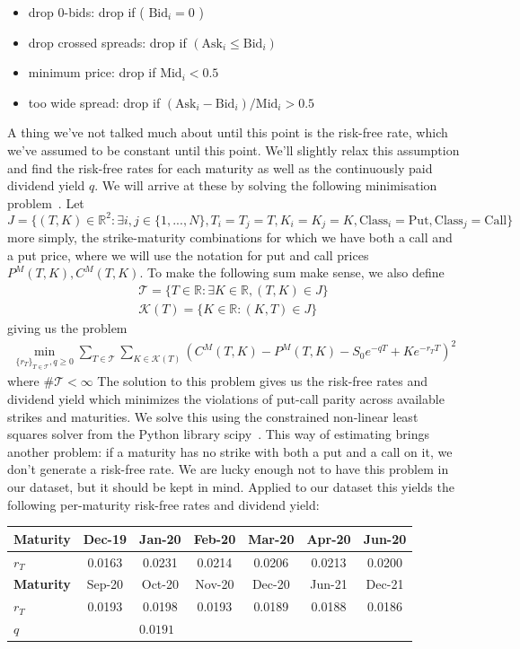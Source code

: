 \begin{itemize}
  \item drop 0-bids: drop if ( $\text{Bid}_i = 0$ )
  \item drop crossed spreads: drop if $( \text{Ask}_i \leq \text{Bid}_i )$
  \item minimum price: drop if  $\text{Mid}_i<0.5$
  \item too wide spread: drop if $(\text{Ask}_i-\text{Bid}_i)/\text{Mid}_i>0.5$
\end{itemize}
A thing we've not talked much about until this point is the risk-free rate, which we've assumed to be constant until this point. We'll
slightly relax this assumption and find the risk-free rates for each maturity as well as the continuously paid dividend yield $q$. We will
arrive at these by solving the following minimisation problem~\cite{DataHandeling}. Let 
$$J=\{(T,K)\in\mathbb{R}^2:\exists i,j\in\{1,...,N\} ,T_i=T_j=T,K_i=K_j=K,\text{Class}_i=\text{Put},\text{Class}_j=\text{Call}\}$$
more simply, the strike-maturity combinations for which we have both a call and a put price, where we will use the notation for put and call prices $P^M(T,K),C^M(T,K)$.
To make the following sum make sense, we also define 
\begin{align}
\mathcal{T}=\{T\in\mathbb{R}:\exists K\in\mathbb{R}, (T,K)\in J\}\\
\mathcal{K}(T)=\{K\in\mathbb{R}:(K,T)\in J\}
\end{align}
giving us the problem
\begin{align}
\min_{\{r_T\}_{T\in\mathcal{T}},q\geq0}\sum_{T\in\mathcal{T}}\sum_{K\in\mathcal{K}(T)}(C^M(T,K)-P^M(T,K)-S_0e^{-qT}+Ke^{-r_T T})^2
\end{align}
where $\#\mathcal{T}<\infty$
The solution to this problem gives us the risk-free rates and dividend yield which minimizes the violations of put-call
parity across available strikes and maturities. We solve this using the constrained non-linear least squares solver from the Python library scipy~\cite{scipy2020}.
This way of estimating brings another problem: if a maturity has no strike with both a put and a call on it, we don't
generate a risk-free rate. We are lucky enough not to have this problem in our dataset, but it should be kept in mind.
Applied to our dataset this yields the following per-maturity risk-free rates and dividend yield:

\begin{center}
\begin{tabular}{lcccccc}
\textbf{Maturity} & Dec-19 & Jan-20 & Feb-20 & Mar-20 & Apr-20 & Jun-20 \\
\hline
$r_T$ & 0.0163 & 0.0231 & 0.0214 & 0.0206 & 0.0213 & 0.0200 \\[6pt]
\textbf{Maturity} & Sep-20 & Oct-20 & Nov-20 & Dec-20 & Jun-21 & Dec-21 \\
\hline
$r_T$ & 0.0193 & 0.0198 & 0.0193 & 0.0189 & 0.0188 & 0.0186 \\[6pt]
\multicolumn{2}{l}{$q$} & \multicolumn{5}{l}{$0.0191$} \\
\end{tabular}
\end{center}

